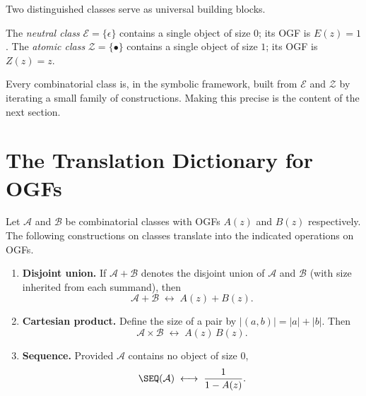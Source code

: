 Two distinguished classes serve as universal building blocks.

\begin{definition}
The \emph{neutral class} $\mathcal{E} = \{\epsilon\}$ contains a single object of
size $0$; its OGF is $E(z) = 1$.  The \emph{atomic class} $\mathcal{Z} =
\{\bullet\}$ contains a single object of size $1$; its OGF is $Z(z) = z$.
\end{definition}

Every combinatorial class is, in the symbolic framework, built from $\mathcal{E}$
and $\mathcal{Z}$ by iterating a small family of constructions.  Making this precise
is the content of the next section.

\section{The Translation Dictionary for OGFs}

\begin{proposition}
\label{prop:symbolic-ogf}
Let $\mathcal{A}$ and $\mathcal{B}$ be combinatorial classes with OGFs $A(z)$ and
$B(z)$ respectively.  The following constructions on classes translate into the
indicated operations on OGFs.
\begin{enumerate}
  \item \textbf{Disjoint union.}  If $\mathcal{A} + \mathcal{B}$ denotes the
        disjoint union of $\mathcal{A}$ and $\mathcal{B}$ (with size inherited from
        each summand), then
        \[
          \mathcal{A} + \mathcal{B} \;\longleftrightarrow\; A(z) + B(z).
        \]
  \item \textbf{Cartesian product.}  Define the size of a pair by
        $|(a,b)| = |a| + |b|$.  Then
        \[
          \mathcal{A} \times \mathcal{B} \;\longleftrightarrow\; A(z)\,B(z).
        \]
  \item \textbf{Sequence.}  Provided $\mathcal{A}$ contains no object of size $0$,
        \[
          \SEQ(\mathcal{A}) \;\longleftrightarrow\; \frac{1}{1 - A(z)}.
        \]
\end{enumerate}
\end{proposition}

